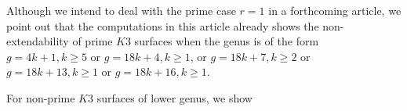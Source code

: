 \documentclass[11pt,twoside]{amsart}
\theoremstyle{plain}
\numberwithin{equation}{section}
\newtheorem{corollary}[theorem]{Corollary}
\theoremstyle{definition}
\begin{document}
 \par

Although we intend to deal with the prime case $r=1$ in a forthcoming article, we point out that the computations in this article already shows the non-extendability of prime $K3$ surfaces when the genus is of the form $g = 4k+1, k \geq 5$ or $g = 18k+4, k \geq 1$, or $g = 18k+7, k \geq 2$ or $g = 18k+13, k \geq 1$ or $g = 18k+16, k \geq 1$.
\vspace{0.2cm}

\color{black}




\color{black}


For non-prime $K3$ surfaces of lower genus, we show 
\end{document}
